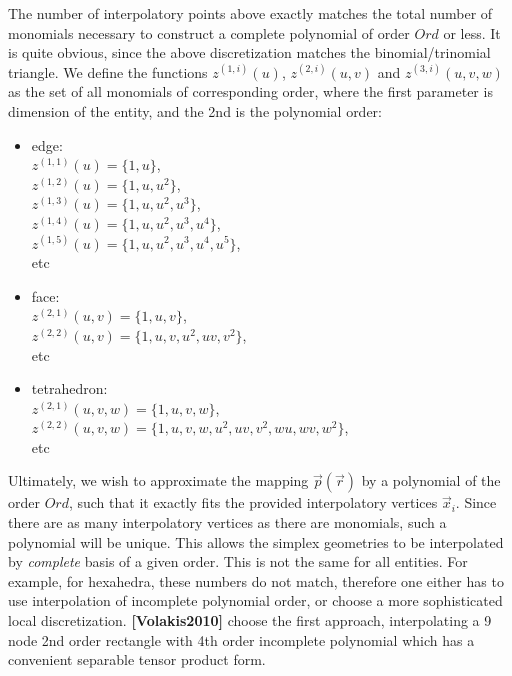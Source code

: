 \noindent
The number of interpolatory points above exactly matches the total number of monomials necessary to construct a complete polynomial of order $Ord$ or less. It is quite obvious, since the above discretization matches the binomial/trinomial triangle. We define the functions $z^{(1,i)}(u)$, $z^{(2,i)}(u,v)$ and $z^{(3,i)}(u,v,w)$ as the set of all monomials of corresponding order, where the first parameter is dimension of the entity, and the 2nd is the polynomial order:
\begin{itemize}
	\item edge: \\
		$z^{(1,1)}(u) = \{1, u\}$, \\
		$z^{(1,2)}(u) = \{1, u, u^2\}$, \\
		$z^{(1,3)}(u) = \{1, u, u^2, u^3\}$, \\
		$z^{(1,4)}(u) = \{1, u, u^2, u^3, u^4\}$, \\
		$z^{(1,5)}(u) = \{1, u, u^2, u^3, u^4, u^5\}$, \\
		etc
	\item face:	\\
		$z^{(2,1)}(u,v)	= \{1, u, v\}$, \\
		$z^{(2,2)}(u,v) = \{1, u, v, u^2, uv, v^2\}$, \\
		etc
	\item tetrahedron: \\
		$z^{(2,1)}(u,v,w) = \{1, u, v, w\}$, \\ 
		$z^{(2,2)}(u,v,w) = \{1, u, v, w, u^2, uv, v^2, wu, wv, w^2\}$, \\
		etc
\end{itemize}

\noindent
Ultimately, we wish to approximate the mapping $\vec{p}(\vec{r})$ by a polynomial of the order $Ord$, such that it exactly fits the provided interpolatory vertices $\vec{x}_i$. Since there are as many interpolatory vertices as there are monomials, such a polynomial will be unique. This allows the simplex geometries to be interpolated by \textit{complete} basis of a given order. This is not the same for all entities. For example, for hexahedra, these numbers do not match, therefore one either has to use interpolation of incomplete polynomial order, or choose a more sophisticated local discretization. \textbf{[Volakis2010]} choose the first approach, interpolating a 9 node 2nd order rectangle with 4th order incomplete polynomial which has a convenient separable tensor product form. \\

